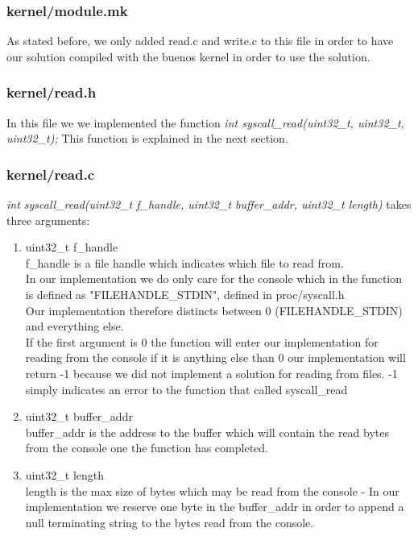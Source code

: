 \documentclass[a4paper,12pt,danish]{report}
\begin{document}
\subsubsection{kernel/module.mk}
As stated before, we only added read.c and write.c to this file in order to have our solution compiled with the buenos kernel in order to use the solution.

\subsubsection{kernel/read.h}
In this file we we implemented the function \textit{int syscall\_read(uint32\_t, uint32\_t, uint32\_t);}
This function is explained in the next section.
\subsubsection{kernel/read.c}
\textit{int syscall\_read(uint32\_t f\_handle, uint32\_t buffer\_addr, uint32\_t length)} takes three arguments:
\begin{enumerate}
    \item{uint32\_t f\_handle}
        \\
        f\_handle is a file handle which indicates which file to read from.
        \\
        In our implementation we do only care for the console which in the function is defined as "FILEHANDLE\_STDIN", defined in proc/syscall.h\\
        Our implementation therefore distincts between 0 (FILEHANDLE\_STDIN) and everything else.\\
        If the first argument is 0 the function will enter our implementation for reading from the console if it is anything else than 0 our implementation will return -1 because we did not implement a solution for reading from files. -1 simply indicates an error to the function that called syscall\_read
    \item{uint32\_t buffer\_addr}
        \\
        buffer\_addr is the address to the buffer which will contain the read bytes from the console one the function has completed.
    \item{uint32\_t length}
        \\
        length is the max size of bytes which may be read from the console - In our implementation we reserve one byte in the buffer\_addr in order to append a null terminating string to the bytes read from the console.
\end{enumerate}
\end{document}

